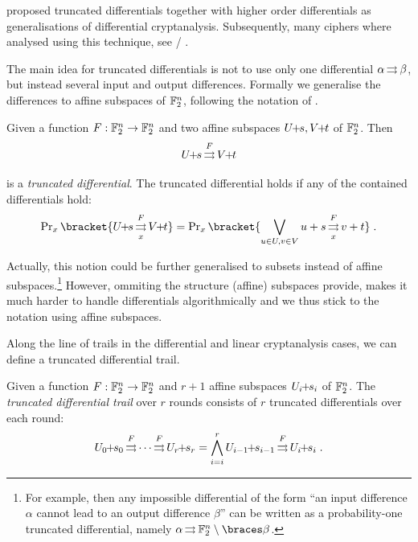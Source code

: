 \textcite{FSE:Knudsen94} proposed truncated differentials together with higher order differentials as generalisations of differential cryptanalysis.
Subsequently, many ciphers where analysed using this technique, see \eg/ .

The main idea for truncated differentials is not to use only one differential $\alpha \operatorname*{\rightrightarrows}^{}_{} \beta$, but instead several input and output differences.
Formally we generalise the differences to affine subspaces of $\mathbb{F}_2^n$, following the notation of \textcite{FSE:BloLeaNyb14}.
\begin{definition}
    Given a function $F : \mathbb{F}_2^n \to \mathbb{F}_2^n$ and two affine subspaces $\coset{U}{s}, \coset{V}{t}$ of $\mathbb{F}_2^n$.
    Then
    \begin{equation*}
        \propDiff{\coset{U}{s}}{F}{}{\coset{V}{t}}
    \end{equation*}
    is a \emph{truncated differential}.
    The truncated differential holds if any of the contained differentials hold:
    \begin{equation*}
        \Prob_x\bracket{\propDiff{\coset{U}{s}}{F}{x}{\coset{V}{t}}} = \Prob_x\bracket{\bigvee_{u \in U, v \in V} \propDiff{u+s}{F}{x}{v+t}}\;.
    \end{equation*}
\end{definition}

Actually, this notion could be further generalised to subsets instead of affine subspaces.\footnote{%
    For example, then any impossible differential of the form \enquote{an input difference $\alpha$ cannot lead to an output difference $\beta$} can be written as a probability-one truncated differential, namely $\propDiff{\alpha}{}{}{\F_2^n \setminus\set{\beta}}$.
}
However, ommiting the structure (affine) subspaces provide, makes it much harder to handle differentials algorithmically and we thus stick to the notation using affine subspaces.

Along the line of trails in the differential and linear cryptanalysis cases, we can define a truncated differential trail.
\begin{definition}
    Given a function $F : \mathbb{F}_2^n \to \mathbb{F}_2^n$ and $r+1$ affine subspaces $U_i \!\! + \!\! s_i$ of $\mathbb{F}_2^n$.
    The \emph{truncated differential trail} over $r$ rounds consists of $r$ truncated differentials over each round:
    \begin{equation*}
        \propDiff{\coset{U_0}{s_0}}{F}{}{\propDiff{\cdots}{F}{}{\coset{U_r}{s_r}}} = \bigwedge_{i=i}^{r} \propDiff{\coset{U_{i-1}}{s_{i-1}}}{F}{}{\coset{U_i}{s_i}}\;.
    \end{equation*}
\end{definition}

